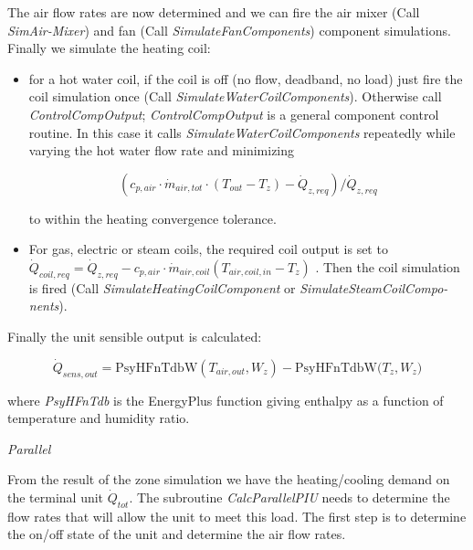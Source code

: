 The air flow rates are now determined and we can fire the air mixer (Call \emph{SimAir-Mixer}) and fan (Call \emph{SimulateFanComponents}) component simulations. Finally we simulate the heating coil:

\begin{itemize}
  \item
    for a hot water coil, if the coil is off (no flow, deadband, no load) just fire the coil simulation once (Call \emph{SimulateWaterCoilComponents}). Otherwise call \emph{ControlCompOutput}; \emph{ControlCompOutput} is a general component control routine. In this case it calls \emph{SimulateWaterCoilComponents} repeatedly while varying the hot water flow rate and minimizing

\begin{equation}
  ({c_{p,air}}\cdot {\dot m_{air,tot}}\cdot ({T_{out}} - {T_z}) - {\dot Q_{z,req}})/{\dot Q_{z,req}}
\end{equation}

to within the heating convergence tolerance.
  \item
    For gas, electric or steam coils, the required coil output is set to \({\dot Q_{coil,req}} = {\dot Q_{z,req}} - {c_{p,air}}\cdot {\dot m_{air,coil}}({T_{air,coil,in}} - {T_z})\) . Then the coil simulation is fired (Call \emph{SimulateHeatingCoilComponent} or \emph{SimulateSteamCoilCompo-nents}).
\end{itemize}

Finally the unit sensible output is calculated:

\begin{equation}
{\dot Q_{sens,out}} = {\mathrm{PsyHFnTdbW}}({T_{air,out}},{W_z}) - {\mathrm{PsyHFnTdbW(}}{T_z},{W_z})
\end{equation}

where \emph{PsyHFnTdb} is the EnergyPlus function giving enthalpy as a function of temperature and humidity ratio.

\emph{Parallel}

From the result of the zone simulation we have the heating/cooling demand on the terminal unit \({\dot Q_{tot}}\). The subroutine \emph{CalcParallelPIU} needs to determine the flow rates that will allow the unit to meet this load. The first step is to determine the on/off state of the unit and determine the air flow rates.

